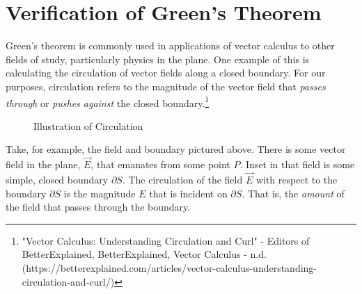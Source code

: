 \documentclass[11pt,English]{article}
\begin{document}
\section{Verification of Green's Theorem}
Green's theorem is commonly used in applications of vector calculus to other fields of study, particularly physics in the plane. One example of this is calculating the circulation of vector fields along a closed boundary. For our purposes, circulation refers to the magnitude of the vector field that \emph{passes through} or \emph{pushes against} the closed boundary.\footnote{"Vector Calculus: Understanding Circulation and Curl" - Editors of BetterExplained, BetterExplained, Vector Calculus - n.d. (https://betterexplained.com/articles/vector-calculus-understanding-circulation-and-curl/)}




\begin{figure}[h]
    \centering
    \caption{Illustration of Circulation}
    \label{Circulation}
\end{figure}



Take, for example, the field and boundary pictured above. There is some vector field in the plane, $\vec{E}$, that emanates from some point $P$. Inset in that field is some simple, closed boundary $\partial S$. The circulation of the field $\vec{E}$ with respect to the boundary $\partial S$ is the magnitude $E$ that is incident on $\partial S$. That is, the \emph{amount} of the field that passes through the boundary.
\end{document}
